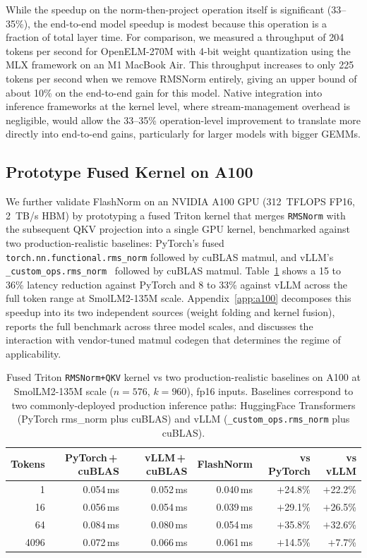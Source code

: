 \documentclass{article}
\begin{document}
While the speedup on the norm-then-project operation itself is significant (33--35\%), the end-to-end model speedup is modest because this operation is a fraction of total layer time. For comparison, we measured a throughput of 204 tokens per second for OpenELM-270M with 4-bit weight quantization using the MLX framework on an M1 MacBook Air. This throughput increases to only 225 tokens per second when we remove RMSNorm entirely, giving an upper bound of about 10\% on the end-to-end gain for this model. Native integration into inference frameworks at the kernel level, where stream-management overhead is negligible, would allow the 33--35\% operation-level improvement to translate more directly into end-to-end gains, particularly for larger models with bigger GEMMs.

\subsection{Prototype Fused Kernel on A100}\label{sec:a100-fused}

We further validate FlashNorm on an NVIDIA A100 GPU (312~TFLOPS FP16, 2~TB/s HBM) by prototyping a fused Triton kernel that merges \texttt{RMSNorm} with the subsequent QKV projection into a single GPU kernel, benchmarked against two production-realistic baselines: PyTorch's fused \texttt{torch.nn.functional.rms\_norm} followed by cuBLAS matmul, and vLLM's \texttt{\_custom\_ops.rms\_norm}~\citep{vLLM} followed by cuBLAS matmul. Table~\ref{tab:a100-fused} shows a 15 to 36\% latency reduction against PyTorch and 8 to 33\% against vLLM across the full token range at SmolLM2-135M scale. Appendix~\ref{app:a100} decomposes this speedup into its two independent sources (weight folding and kernel fusion), reports the full benchmark across three model scales, and discusses the interaction with vendor-tuned matmul codegen that determines the regime of applicability.

\begin{table}[h!] \centering
\caption{Fused Triton \texttt{RMSNorm+QKV} kernel vs two production-realistic baselines on A100 at SmolLM2-135M scale ($n{=}576$, $k{=}960$), fp16 inputs. Baselines correspond to two commonly-deployed production inference paths: HuggingFace Transformers (PyTorch rms\_norm plus cuBLAS) and vLLM (\texttt{\_custom\_ops.rms\_norm} plus cuBLAS).}
\label{tab:a100-fused}
\begin{tabular}{r r r r r r}
\hline
Tokens & PyTorch\,+\,cuBLAS & vLLM\,+\,cuBLAS & FlashNorm & vs PyTorch & vs vLLM \\
\hline
1     & 0.054\,ms & 0.052\,ms & 0.040\,ms & $+$24.8\% & $+$22.2\% \\
16    & 0.056\,ms & 0.054\,ms & 0.039\,ms & $+$29.1\% & $+$26.5\% \\
64    & 0.084\,ms & 0.080\,ms & 0.054\,ms & $+$35.8\% & $+$32.6\% \\
4096  & 0.072\,ms & 0.066\,ms & 0.061\,ms & $+$14.5\% & $+$7.7\%  \\
\hline
\end{tabular}
\end{table}
\end{document}
